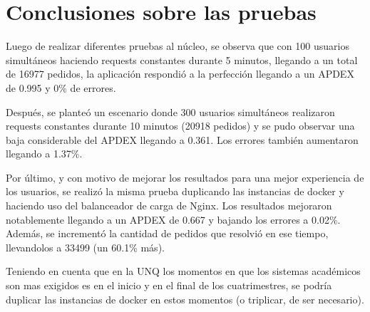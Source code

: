 \section{Conclusiones sobre las pruebas}

Luego de realizar diferentes pruebas al núcleo, se observa que con 100 usuarios simultáneos haciendo requests constantes durante 5 minutos, llegando a un total de 16977 pedidos, la aplicación respondió a la perfección llegando a un APDEX de 0.995 y 0\% de errores.

Después, se planteó un escenario donde 300 usuarios simultáneos realizaron requests constantes durante 10 minutos (20918 pedidos) y se pudo observar una baja considerable del APDEX llegando a 0.361. Los errores también aumentaron llegando a 1.37\%. 

Por último, y con motivo de mejorar los resultados para una mejor experiencia de los usuarios, se realizó la misma prueba duplicando las instancias de docker y haciendo uso del balanceador de carga de Nginx. Los resultados mejoraron notablemente llegando a un APDEX de 0.667 y bajando los errores a 0.02\%. Además, se incrementó la cantidad de pedidos que resolvió en ese tiempo, llevandolos a 33499 (un 60.1\% más).

Teniendo en cuenta que en la UNQ los momentos en que los sistemas académicos son mas exigidos es en el inicio y en el final de los cuatrimestres, se podría duplicar las instancias de docker en estos momentos (o triplicar, de ser necesario).
